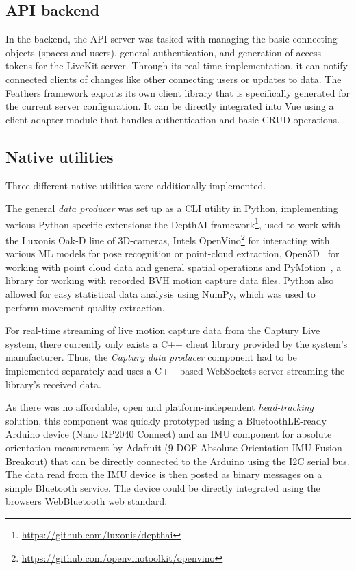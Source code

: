 \subsection{API backend}
\label{subsec:api-backend}

In the backend, the \ac{API} server was tasked with managing the basic connecting objects (spaces and users), general authentication, and generation of access tokens for the LiveKit server.
Through its real-time implementation, it can notify connected clients of changes like other connecting users or updates to data.
The Feathers framework exports its own client library that is specifically generated for the current server configuration.
It can be directly integrated into Vue using a client adapter module that handles authentication and basic \ac{CRUD} operations.

\subsection{Native utilities}
\label{subsec:native-utilities}

Three different native utilities were additionally implemented.

The general \emph{data producer} was set up as a \ac{CLI} utility in Python, implementing various Python-specific extensions: the DepthAI framework\footnote{\url{https://github.com/luxonis/depthai}}, used to work with the Luxonis Oak-D line of \ac{3D}-cameras, Intel\textquotesingle s OpenVino\footnote{\url{https://github.com/openvinotoolkit/openvino}} for interacting with various \ac{ML} models for pose recognition or point-cloud extraction, Open3D~\parencite{open3DZhou2018} for working with point cloud data and general spatial operations and PyMotion~\parencite{githubPyMotion}, a library for working with recorded \ac{BVH} motion capture data files.
Python also allowed for easy statistical data analysis using NumPy, which was used to perform movement quality extraction.

For real-time streaming of live motion capture data from the Captury Live system, there currently only exists a C++ client library provided by the system's manufacturer.
Thus, the \emph{Captury data producer} component had to be implemented separately and uses a C++-based WebSockets server streaming the library's received data.

As there was no affordable, open and platform-independent \emph{head-tracking} solution, this component was quickly prototyped using a BluetoothLE-ready Arduino device (Nano RP2040 Connect) and an \ac{IMU} component for absolute orientation measurement by Adafruit (9-DOF Absolute Orientation IMU Fusion Breakout) that can be directly connected to the Arduino using the \ac{I2C} serial bus.
The data read from the \ac{IMU} device is then posted as binary messages on a simple Bluetooth service.
The device could be directly integrated using the browser\textquotesingle s WebBluetooth web standard.

